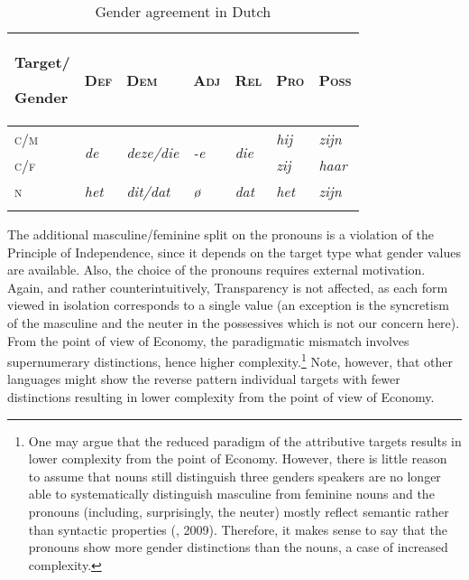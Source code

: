 \documentclass[output=collectionpaper]{langsci/langscibook}
\begin{document}
\begin{table}
\begin{tabularx}{\textwidth}{lXXXXXl}
\lsptoprule
{\bfseries Target/}

\bfseries Gender & \bfseries \textsc{Def} & \bfseries \textsc{Dem} & \bfseries \textsc{Adj} & \bfseries \textsc{Rel} & \bfseries \textsc{Pro} & \bfseries \textsc{Poss}\\
\midrule
\textsc{c/m} & \multirow{2}{*}{\textit{de}} & \multirow{2}{*}{\textit{deze/die}} & \multirow{2}{*}{\textit{{}-e}} & \multirow{2}{*}{\textit{die}} & \textit{hij} & \textit{zijn}\\
\textsc{c/f} &  &  &  &  & \textit{zij} & \textit{haar}\\
\textsc{n} & \textit{het} & \textit{dit/dat} & \textit{ø}\footnotemark{} & \textit{dat} & \textit{het} & \textit{zijn}\\
\lspbottomrule
\end{tabularx}
\caption{Gender agreement in Dutch}
\label{tab:Audr:4}
\end{table}
%

The additional masculine/feminine split on the pronouns is a violation of the Principle of Independence, since it depends on the target type what gender values are available. Also, the choice of the pronouns requires external motivation. Again, and rather counterintuitively, Transparency is not affected, as each form viewed in isolation corresponds to a single value (an exception is the syncretism of the masculine and the neuter in the possessives which is not our concern here). From the point of view of Economy, the paradigmatic mismatch involves supernumerary distinctions, hence higher complexity.\footnote{One may argue that the reduced paradigm of the attributive targets results in lower complexity from the point of Economy. However, there is little reason to assume that  nouns still distinguish three genders \textendash{} speakers are no longer able to systematically distinguish masculine from feminine nouns \textendash{} and the pronouns (including, surprisingly, the neuter) mostly reflect semantic rather than syntactic properties (\citealt{Audring2006}, 2009). Therefore, it makes sense to say that the pronouns show more gender distinctions than the nouns, a case of increased complexity.} Note, however, that other languages might show the reverse pattern \textendash{} individual targets with fewer distinctions \textendash{} resulting in lower complexity from the point of view of Economy.
\end{document}
